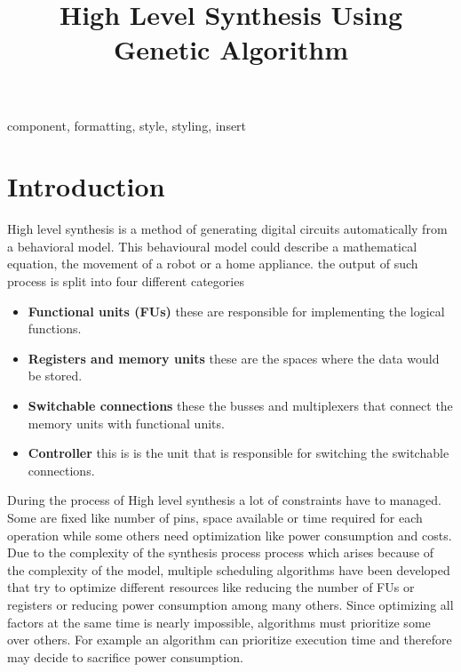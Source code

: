 \documentclass[conference]{IEEEtran}
\begin{document}
\title{High Level Synthesis Using Genetic Algorithm\\
}

\author{
}

\maketitle

\begin{abstract}

\end{abstract}

\begin{IEEEkeywords}
component, formatting, style, styling, insert
\end{IEEEkeywords}

\section{Introduction}
High level synthesis is a method of generating digital circuits automatically from a behavioral model. This behavioural model  could describe a mathematical equation, the movement of a robot or a home appliance. the output of such process is split into four different categories \cite{fourcategories}
\begin{itemize}
    \item \textbf{Functional units (FUs)} these are responsible for implementing the logical functions.
    \item \textbf{Registers and memory units} these are the spaces where the data would be stored.
    \item \textbf{Switchable connections} these the busses and multiplexers that connect the memory units with functional units.
    \item \textbf{Controller} this is is the unit that is responsible for switching the switchable connections.
\end{itemize}
During the process of High level synthesis a lot of constraints have to managed. Some are fixed like number of pins, space available or time required for each operation while some others need optimization like power consumption and costs.
Due to the complexity of the synthesis process process which arises because of the complexity of the model, multiple scheduling algorithms have been developed that try to optimize different resources like reducing the number of FUs or registers or reducing power consumption among many others. Since optimizing all factors at the same time is nearly impossible, algorithms must prioritize some over others. For example an algorithm can prioritize execution time and therefore may decide to sacrifice power consumption.
\end{document}

